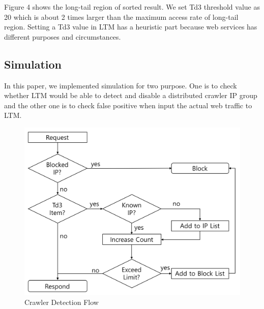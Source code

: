 \documentclass[sigconf,anonymous=true]{acmart}
\begin{document}
Figure 4 shows the long-tail region of sorted result. We set Td3 threshold value as 20 which is about 2 times larger than the maximum access rate of long-tail region. Setting a Td3 value in LTM has a heuristic part because web services has different purposes and circumstances.

\subsection{Simulation}
In this paper, we implemented simulation for two purpose. One is to check whether LTM would be able to detect and disable a distributed crawler IP group and the other one is to check false positive when input the actual web traffic to LTM.

\begin{figure} [H]
    \includegraphics[width=0.88\columnwidth]{figs/flow_chart_01.png}
    \caption{Crawler Detection Flow}
    \label{fig:fig6}
\end{figure}
\end{document}
